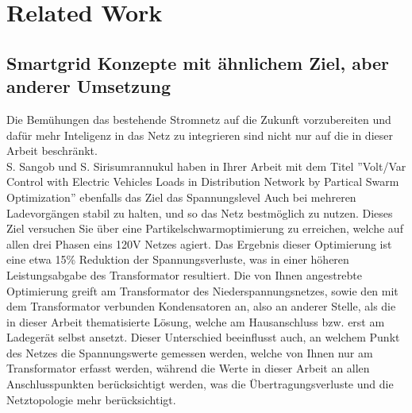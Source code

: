 \chapter{Related Work}
\newpage
\section{Smartgrid Konzepte mit ähnlichem Ziel, aber anderer Umsetzung}
Die Bemühungen das bestehende Stromnetz auf die Zukunft vorzubereiten und dafür mehr Inteligenz in das Netz zu integrieren sind nicht nur auf die in dieser Arbeit beschränkt. \\
S. Sangob und S. Sirisumrannukul haben in Ihrer Arbeit mit dem Titel ''Volt/Var Control with Electric Vehicles Loads in Distribution Network by Partical Swarm Optimization'' \cite{RW_1_1}  ebenfalls das Ziel das Spannungslevel Auch bei mehreren Ladevorgängen stabil zu halten, und so das Netz bestmöglich zu nutzen. Dieses Ziel versuchen Sie über eine Partikelschwarmoptimierung zu erreichen, welche auf allen drei Phasen eins 120V Netzes agiert. Das Ergebnis dieser Optimierung ist eine etwa 15\% Reduktion der Spannungsverluste, was in einer höheren Leistungsabgabe des Transformator resultiert. Die von Ihnen angestrebte Optimierung greift  am Transformator des Niederspannungsnetzes, sowie den mit dem Transformator verbunden Kondensatoren an, also an anderer Stelle, als die in dieser Arbeit thematisierte Lösung, welche am Hausanschluss bzw. erst am Ladegerät selbst ansetzt. Dieser Unterschied beeinflusst auch, an welchem Punkt des Netzes die Spannungswerte gemessen werden, welche von Ihnen nur am Transformator erfasst werden, während die Werte in dieser Arbeit an allen Anschlusspunkten berücksichtigt werden, was die Übertragungsverluste und die Netztopologie mehr berücksichtigt.
\\
